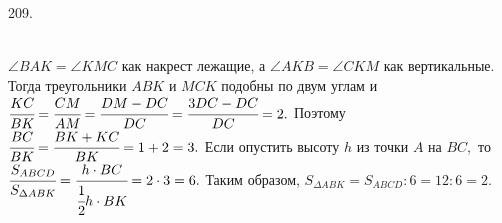 209. \begin{figure}[ht!]
\end{figure}\\
$\angle BAK=\angle KMC$ как накрест лежащие, а $\angle AKB=\angle CKM$ как вертикальные. Тогда треугольники $ABK$ и $MCK$ подобны по двум углам и $\cfrac{KC}{BK}=\cfrac{CM}{AM}=\cfrac{DM-DC}{DC}=\cfrac{3DC-DC}{DC}=2.$ Поэтому $\cfrac{BC}{BK}=\cfrac{BK+KC}{BK}=1+2=3.$ Если опустить высоту $h$ из точки $A$ на $BC,$ то $\cfrac{S_{ABCD}}{S_{\Delta ABK}}=\cfrac{h\cdot BC}{\cfrac{1}{2}h\cdot BK}=2\cdot3=6.$ Таким образом, $S_{\Delta ABK}=S_{ABCD}:6=12:6=2.$\\
